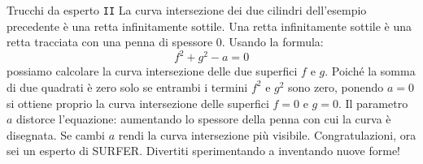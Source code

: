 \begin{surferPage}{Trucchi da esperto {\tt II}}
La curva intersezione dei due cilindri dell'esempio precedente \`e una retta infinitamente sottile. Una retta infinitamente sottile \`e una retta tracciata con una penna di spessore $0$. Usando la formula:
\[ f^2+g^2-a=0\]
possiamo calcolare la curva intersezione delle due superfici $f$ e $g$. Poich\'e la somma di due quadrati  \`e zero  solo se entrambi i termini $f^2$ e $g^2$ sono zero, ponendo $a=0$ si ottiene proprio la curva intersezione delle superfici $f=0$ e $g=0$.
Il parametro $a$ distorce l'equazione: aumentando lo spessore della penna con cui la curva \`e disegnata. Se cambi $a$ rendi la curva intersezione pi\`u visibile. 
\newline \newline
Congratulazioni, ora sei un esperto di SURFER. Divertiti sperimentando a inventando nuove forme!
\end{surferPage}
